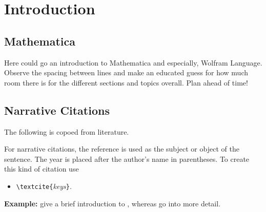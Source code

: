 \chapter{Introduction}
\label{cha:Introduction}


\section{Mathematica}

Here could go an introduction to Mathematica and especially, Wolfram Language. Observe the spacing between lines and make an educated guess for how much room there is for the different sections and topics overall. Plan ahead of time!

\section{Narrative Citations}

The following is copoed from literature.

For narrative citations, the reference is used as the subject or object of the
sentence. The year is placed after the author's name in parentheses. To create
this kind of citation use 
%
\begin{itemize}
\item[] \verb!\textcite{!\textit{keys}\verb!}!.
\end{itemize}
%
\textbf{Example:}
\textcite{Daniel2018} give a brief introduction to \latex, whereas \textcite{Oetiker2021, Kopka2003} 
go into more detail.